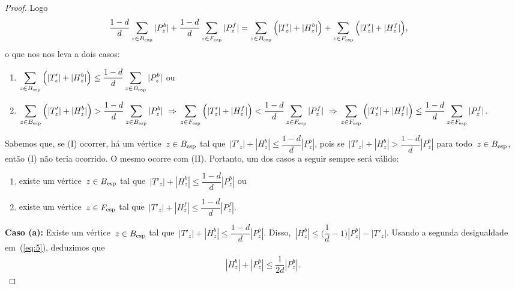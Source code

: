 \begin{proof}
			Logo
	\begin{align}
			\dfrac{1-d}{d}\displaystyle\sum_{z\in B_{\mathrm{esp}}}|P_z^b| &+ 
			\dfrac{1-d}{d}\displaystyle\sum_{z\in F_{\mathrm{esp}}}|P_z^f|
			= \displaystyle\sum_{z\in B_{\mathrm{esp}}}
			\Big(|T'_{z}|+|H_z^b|\Big) + 
			\displaystyle\sum_{z\in F_{\mathrm{esp}}}
			\Big(|T'_{z}|+|H_z^f|\Big),\nonumber
	\end{align}
	o que nos nos leva a dois casos:
	\begin{enumerate}[label=(\Roman*)]   %
		\item $\displaystyle\sum_{z\in B_{\mathrm{esp}}}
			\Big(|T'_{z}|+|H_z^b|\Big)\le
			\dfrac{1-d}{d}\displaystyle\sum_{z\in B_{\mathrm{esp}}}|P_z^b|$
			ou
		\item $\displaystyle\sum_{z\in B_{\mathrm{esp}}}
			\Big(|T'_{z}|+|H_z^b|\Big)>
			\dfrac{1-d}{d}\displaystyle\sum_{z\in B_{\mathrm{esp}}}|P_z^b|
			\ \Rightarrow \\
			\displaystyle\sum_{z\in F_{\mathrm{esp}}}
			\Big(|T'_{z}|+|H_z^f|\Big)<
			\dfrac{1-d}{d}\displaystyle\sum_{z\in F_{\mathrm{esp}}}|P_z^f|
			\ \Rightarrow \\
			\displaystyle\sum_{z\in F_{\mathrm{esp}}}
			\Big(|T'_{z}|+|H_z^f|\Big)\le
			\dfrac{1-d}{d}\displaystyle\sum_{z\in F_{\mathrm{esp}}}|P_z^f|$.
	\end{enumerate}

	Sabemos que, se (I) ocorrer, há um 
	vértice~${z\in B_{\mathrm{esp}}}$ tal que~${|T'_z|+|H^b_z|\le \dfrac{1-d}{d}|P^b_z|}$,
	pois se~${|T'_z|+|H^b_z| > \dfrac{1-d}{d}|P^b_z|}$ para
	todo~${z\in B_{\mathrm{esp}}}$,
	então (I)
	não teria ocorrido.
	O mesmo ocorre com (II). 
	Portanto, um dos casos a seguir sempre será válido:

	\begin{enumerate}[label=(\alph*)]
		\item existe um vértice~$z\in B_{\mathrm{esp}}$ 
			tal que~$|T'_{z}|+|H_z^b|\le
			\dfrac{1-d}{d}|P_z^b|$ ou
		\item existe um vértice~$z\in F_{\mathrm{esp}}$ 
			tal que~$|T'_{z}|+|H_z^f|\le
			\dfrac{1-d}{d}|P_z^f|.$
	\end{enumerate}

	\bigskip
	\bigskip
	
	\textbf{Caso (a):}
		Existe um vértice~$z\in B_{\mathrm{esp}}$ 
		tal que~${|T'_{z}|+|H_z^b|\le
		\dfrac{1-d}{d}|P_z^b|}$. 
		Disso,~${|H^b_z|\le \Big(\dfrac{1}{d}-1\Big)|P^b_z|-|T'_z|}$.
		Usando a segunda desigualdade em~(\ref{eq:5}), deduzimos
		que
		\begin{align}
			|H^b_z|+|P^b_z|\le\dfrac{1}{2d}|P^b_z|. \nonumber
		\end{align}


\end{proof}
